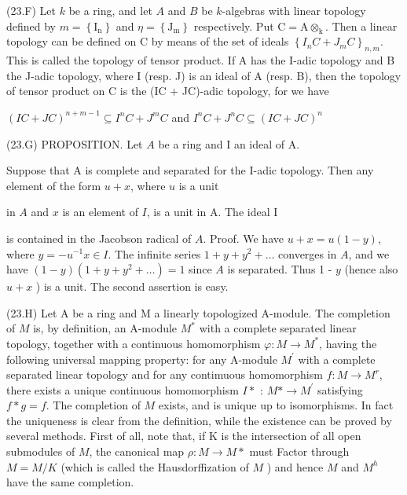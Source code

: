 (23.F) Let $k$ be a ring, and let $A$ and $B$ be $k$-algebras with linear topology defined by $m=\left\{\mathrm{I}_{\mathrm{n}}\right\}$ and $\eta=\left\{\mathrm{J}_{\mathrm{m}}\right\}$ respectively. Put $\mathrm{C}=\mathrm{A} \otimes_{\mathrm{k}}$. Then a linear topology can be defined on $\mathrm{C}$ by means of the set of ideals $\left\{I_{n} C+J_{m} C\right\}_{n, m}$. This is called the topology of tensor product. If A has the I-adic topology and B the J-adic topology, where I (resp. J) is an ideal of A (resp. B), then the topology of tensor product on $\mathrm{C}$ is the (IC $+$ JC)-adic topology, for we have

$(I C+J C)^{n+m-1} \subseteq I^{n} C+J^{m} C$ and $I^{n} C+J^{n} C \subseteq(I C+J C)^{n}$

(23.G) PROPOSITION. Let $A$ be a ring and I an ideal of A.

Suppose that A is complete and separated for the I-adic topology. Then any element of the form $u+x$, where $u$ is a unit

in $A$ and $x$ is an element of $I$, is a unit in A. The ideal I

is contained in the Jacobson radical of $A$. Proof. We have $u+x=u(1-y)$, where $y=-u^{-1} x \in I$. The infinite series $1+y+y^{2}+\ldots$ converges in $A$, and we have $(1-y)\left(1+y+y^{2}+\ldots\right)=1$ since $A$ is separated. Thus 1 - $y$ (hence also $u+x$ ) is a unit. The second assertion is easy.

(23.H) Let A be a ring and M a linearly topologized A-module. The completion of $M$ is, by definition, an A-module $M^{*}$ with a complete separated linear topology, together with a continuous homomorphism $\varphi: M \rightarrow M^{*}$, having the following universal mapping property: for any A-module $M^{\prime}$ with a complete separated linear topology and for any contimuous homomorphism $f: M \rightarrow M^{r}$, there exists a unique continuous homomorphism $I *$ : $M * \rightarrow M^{\prime}$ satisfying $f * g=f$. The completion of $M$ exists, and is unique up to isomorphisms. In fact the uniqueness is clear from the definition, while the existence can be proved by several methods. First of all, note that, if $\mathrm{K}$ is the intersection of all open submodules of $M$, the canonical map $\rho: M \rightarrow M *$ must Factor through $M=M / K$ (which is called the Hausdorffization of $M$ ) and hence $M$ and $M^{h}$ have the same completion.

